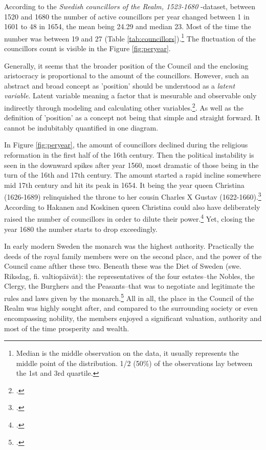 According to the \textit{Swedish councillors of the Realm, 1523-1680} -dataset, between 1520 and 1680 the number of active councillors per year changed between 1 in 1601 to 48 in 1654, the mean being 24.29 and median 23. Most of the time the number was between 19 and 27 (Table \ref{tab:councillors}).\footnote{Median is the middle observation on the data, it usually represents the middle point of the distribution.\cites[p. 26,]{statisticsfor}[p. 30-31.]{MooreEtAl} 1/2 (50\%) of the observations lay between the 1st and 3rd quartile.\cite[p. 32-33.]{MooreEtAl}} The fluctuation of the councillors count is visible in the Figure \ref{fig:peryear}. 

Generally, it seems that the broader position of the Council and the enclosing aristocracy is proportional to the amount of the councillors. However, such an abstract and broad concept as 'position' should be understood as a \textit{latent variable}. Latent variable meaning a factor that is mesurable and observable only indirectly through modeling and calculating other variables.\footcite{apa}. As well as the definition of 'position' as a concept not being that simple and straight forward. It cannot be indubitably quantified in one diagram.

In Figure \ref{fig:peryear}, the amount of councillors declined during the religious reformation in the first half of the 16th century. Then the political instability is seen in the downward spikes after year 1560, most dramatic of those being in the turn of the 16th and 17th century. The amount started a rapid incline somewhere mid 17th century and hit its peak in 1654. It being the year queen Christina (1626-1689) relinquished the throne to her cousin Charles X Gustav (1622-1660).\footcite[p. 8-9.]{personalAgency} According to Hakanen and Koskinen queen Christina could also have deliberately raised the number of councillors in order to dilute their power.\footcite[p. 63-64.]{HakanenAKoskinen2017} Yet, closing the year 1680 the number starts to drop exceedingly.

In early modern Sweden the monarch was the highest authority. Practically the deeds of the royal family members were on the second place, and the power of the Council came afther these two. Beneath these was the Diet of Sweden (swe. Riksdag, fi. valtiopäivät): the representatives of the four estates–the Nobles, the Clergy, the Burghers and the Peasants–that was to negotiate and legitimate the rules and laws given by the monarch.\footcite[p. 57-61.]{pSuurvalta}  All in all, the place in the Council of the Realm was highly sought after, and compared to the surrounding society or even encompassing nobility, the members enjoyed a significant valuation, authority and most of the time prosperity and wealth.

